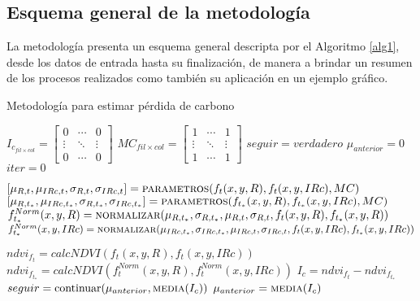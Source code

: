 \subsection{Esquema general de la metodolog\'ia}
La metodolog\'ia presenta un esquema general descripta por el Algoritmo \ref{alg1}, desde los datos de entrada hasta su finalizaci\'on, de manera a brindar un resumen de los procesos realizados como también su aplicaci\'on en un ejemplo gr\'afico.
\begin{algorithm}
	\caption{Metodolog\'ia para estimar p\'erdida de carbono}
	\label{alg1}
	\begin{algorithmic}[1]
		\Statex
		\State $ I_{c_{fil \times col}}=  \begin{bmatrix}
		0 & \cdots & 0 \\
		\vdots & \ddots &  \vdots \\
		0 & \cdots & 0
		\end{bmatrix} $ 
		\State $ MC_{fil \times col} = \begin{bmatrix}
		1 & \cdots & 1 \\
		\vdots & \ddots &  \vdots \\
		1 & \cdots & 1
		\end{bmatrix} $ 
		\State $ seguir = verdadero $ 
		\State $\mu_{anterior} =0$ 
		\Statex
		\State $ iter = 0 $
		
			\State {}
			\State {}
			\State $[\mu_{R,t},\mu_{IRc,t},\sigma_{R,t},\sigma_{IRc,t}] = \textsc{parametros}(f_{t}(x,y,R),f_{t}(x,y,IRc),MC)$		
			\State $[\mu_{R,t_{*}},\mu_{IRc,t_{*}},\sigma_{R,t_{*}},\sigma_{IRc,t_{*}}] = \textsc{parametros}(f_{t_{*}}(x,y,R),f_{t_{*}}(x,y,IRc),MC)$
			\Statex
			\State {}
			\State $f_{t_{*}}^{Norm}(x,y,R) = \textsc{normalizar}(\mu_{R,t_{*}},\sigma_{R,t_{*}},\mu_{R,t},\sigma_{R,t},f_{t}(x,y,R),f_{t_{*}}(x,y,R))$  
			\State $f_{t_{*}}^{Norm}(x,y,IRc) = \textsc{normalizar}(\mu_{IRc,t_{*}},\sigma_{IRc,t_{*}},\mu_{IRc,t},\sigma_{IRc,t},f_{t}(x,y,IRc),f_{t_{*}}(x,y,IRc))$  
			
			\State {}
			\State $ndvi_{f_{t}}=calcNDVI(f_{t}(x,y,R),f_{t}(x,y,IRc))$
			\State $ndvi_{f_{t_{*}}}=calcNDVI(f_{t}^{Norm}(x,y,R),f_{t}^{Norm}(x,y,IRc))$
			\Statex
			\State {}
			\State $I_{c} = ndvi_{f_{t}} - ndvi_{f_{t_{*}}}$
			\State {}
			\State $seguir=\text{continuar}(\mu_{anterior},\textsc{media}(I_{c}))$
			\State $\mu_{anterior}=\textsc{media}(I_{c})$
			\Statex
			

\end{algorithmic}
\end{algorithm}
